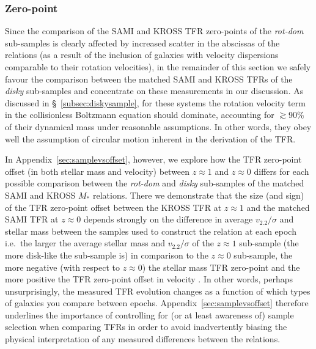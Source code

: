 \documentclass[a4paper,fleqn,usenatbib]{mnras}
\begin{document}
{\subsubsection{Zero-point}

Since the comparison of the SAMI and KROSS TFR zero-points of the \textit{rot-dom} sub-samples is clearly affected by increased scatter in the abscissas of the relations (as a result of the inclusion of galaxies with velocity dispersions comparable to their rotation velocities), in the remainder of this section we safely favour the comparison between the matched SAMI and KROSS TFRs of the \textit{disky} sub-samples and concentrate on these measurements in our discussion. As discussed in \S~\ref{subsec:diskysample}, for these systems the rotation velocity term in the collisionless Boltzmann equation should dominate, accounting for $\gtrsim$90\% of their dynamical mass under reasonable assumptions. In other words, they obey well the assumption of circular motion inherent in the derivation of the TFR.

In Appendix~\ref{sec:samplevsoffset}, however, we explore how the TFR zero-point offset (in both stellar mass and velocity) between $z\approx1$ and $z\approx0$ differs for each possible comparison between the \textit{rot-dom} and \textit{disky} sub-samples of the matched SAMI and KROSS $M_{*}$ relations. There we demonstrate that the size (and sign) of the TFR zero-point offset between the KROSS TFR at $z\approx1$ and the matched SAMI TFR at $z\approx0$ depends strongly on the difference in average $v_{2.2}/\sigma$ and stellar mass between the samples used to construct the relation at each epoch i.e.\ the larger the average stellar mass and $v_{2.2}/\sigma$ of the $z\approx1$ sub-sample (the more disk-like the sub-sample is) in comparison to the $z\approx0$ sub-sample, the more negative (with respect to $z\approx0$) the stellar mass TFR zero-point and the more positive the TFR zero-point offset in velocity \citep[see also][]{Turner:2017b}. In other words, perhaps unsurprisingly, the measured TFR evolution changes as a function of which types of galaxies you compare between epochs. Appendix~\ref{sec:samplevsoffset} therefore underlines the importance of controlling for (or at least awareness of) sample selection when comparing TFRs in order to avoid inadvertently biasing the physical interpretation of any measured differences between the relations.

}
\end{document}
